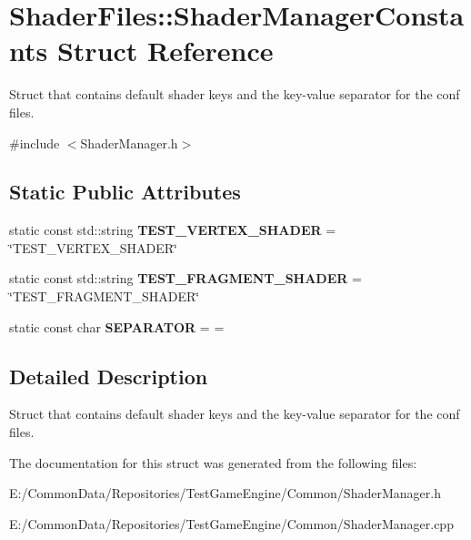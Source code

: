 \hypertarget{struct_shader_files_1_1_shader_manager_constants}{}\section{Shader\+Files\+::Shader\+Manager\+Constants Struct Reference}
\label{struct_shader_files_1_1_shader_manager_constants}


Struct that contains default shader keys and the key-\/value separator for the conf files.  




{\ttfamily \#include $<$Shader\+Manager.\+h$>$}

\subsection*{Static Public Attributes}
\begin{DoxyCompactItemize}
\item 
\mbox{\label{struct_shader_files_1_1_shader_manager_constants_ad67ef09570015f57ab38cf6a48a98fb4}} 
static const std\+::string {\bfseries T\+E\+S\+T\+\_\+\+V\+E\+R\+T\+E\+X\+\_\+\+S\+H\+A\+D\+ER} = \char`\"{}T\+E\+S\+T\+\_\+\+V\+E\+R\+T\+E\+X\+\_\+\+S\+H\+A\+D\+ER\char`\"{}
\item 
\mbox{\label{struct_shader_files_1_1_shader_manager_constants_aba00beed3a4613a37283cdb7f62b160a}} 
static const std\+::string {\bfseries T\+E\+S\+T\+\_\+\+F\+R\+A\+G\+M\+E\+N\+T\+\_\+\+S\+H\+A\+D\+ER} = \char`\"{}T\+E\+S\+T\+\_\+\+F\+R\+A\+G\+M\+E\+N\+T\+\_\+\+S\+H\+A\+D\+ER\char`\"{}
\item 
\mbox{\label{struct_shader_files_1_1_shader_manager_constants_a6cf464bdc6ee911d2e83ca35eab9d5df}} 
static const char {\bfseries S\+E\+P\+A\+R\+A\+T\+OR} = \textquotesingle{}=\textquotesingle{}
\end{DoxyCompactItemize}


\subsection{Detailed Description}
Struct that contains default shader keys and the key-\/value separator for the conf files. 

The documentation for this struct was generated from the following files\+:\begin{DoxyCompactItemize}
\item 
E\+:/\+Common\+Data/\+Repositories/\+Test\+Game\+Engine/\+Common/Shader\+Manager.\+h\item 
E\+:/\+Common\+Data/\+Repositories/\+Test\+Game\+Engine/\+Common/Shader\+Manager.\+cpp\end{DoxyCompactItemize}
